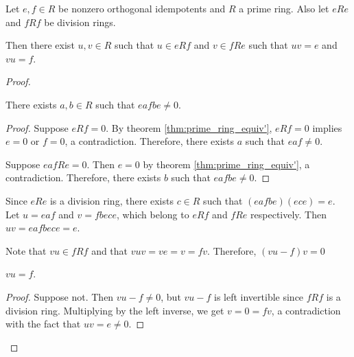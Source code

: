   \begin{theorem}
    \label{thm:orthogonal_idempotents_division_ring}
    Let $e, f \in R$ be nonzero orthogonal idempotents and $R$ a prime ring. Also let $eRe$ and $fRf$ be division rings. 

    Then there exist $u, v \in R$ such that $u \in eRf$ and $v \in fRe$ such that $uv = e$ and $vu = f$.
  \end{theorem}
  \begin{proof}
    \begin{claim}
      There exists $a, b \in R$ such that $eafbe \neq 0$.
    \end{claim}
    \begin{proof}
      Suppose $eRf = 0$. By theorem \ref{thm:prime_ring_equiv'}, $eRf = 0$ implies $e = 0$ or $f = 0$, a contradiction. Therefore, there exists $a$ such that $eaf \neq 0$. 

      Suppose $eafRe = 0$. Then $e = 0$ by theorem \ref{thm:prime_ring_equiv'}, a contradiction. Therefore, there exists $b$ such that $eafbe \neq 0$.
    \end{proof}
    Since $eRe$ is a division ring, there exists $c \in R$ such that $(eafbe)(ece) = e$. Let $u = eaf$ and $v = fbece$, which belong to $eRf$ and $fRe$ respectively. Then $uv = eafbece = e$.

    Note that $vu \in fRf$ and that $vuv = ve = v = fv$. Therefore, $(vu - f) v = 0$ 
    \begin{claim}
      $vu = f$.
    \end{claim}
    \begin{proof}
      Suppose not. Then $vu - f \neq 0$, but $vu - f$ is left invertible since $fRf$ is a division ring. Multiplying by the left inverse, we get $v = 0 = fv$, a contradiction with the fact that $uv = e \neq 0$.
    \end{proof}
  \end{proof}

